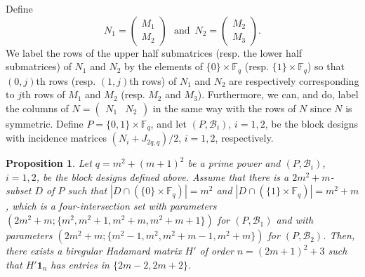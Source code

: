 \documentclass[10pt]{amsart}
\newtheorem{prop}[theo]{Proposition}
\theoremstyle{definition}
\newcommand*\F{{\mathbb F}}
\newcommand*{\un}{\mathbf{1}}
\begin{document}
Define
\[
N_1=
\begin{pmatrix} M_1 \\ M_2
\end{pmatrix} \, \, \mbox{ and }\, N_2=
\begin{pmatrix} M_2 \\ M_3
\end{pmatrix}.
\]
We label the rows of the upper half submatrices (resp. the lower half submatrices) of $N_1$ and $N_2$ by the elements of $\{0\}\times \F_q$ (resp. $\{1\}\times \F_q$) so that $(0,j)$th rows (resp. $(1,j)$th rows) of $N_1$ and $N_2$ are respectively corresponding to $j$th rows of $M_1$ and $M_2$ (resp. $M_2$ and $M_3$). Furthermore, we can, and do, label the columns of $N=\begin{pmatrix} N_1& N_2 \end{pmatrix} $ in the same way with the rows of $N$ since $N$ is symmetric. Define $P=\{0,1\}\times \F_q$, and let $(P,{\mathcal B}_i)$, $i=1,2$, be the block designs with incidence matrices $(N_i+J_{2q,q})/2$, $i=1,2$, respectively.

\begin{prop}\label{prop:const2}
Let $q=m^2+(m+1)^2$ be a prime power and $(P,{\mathcal B}_i)$, $i=1,2$, be the block designs defined above. Assume that there is a $2m^2+m$-subset $D$ of $P$ such that $|D\cap (\{0\}\times \F_q)|=m^2$ and $|D\cap (\{1\}\times \F_q)|=m^2+m$, which is a four-intersection set with parameters $(2m^2+m;\{m^2,m^2+1,m^2+m,m^2+m+1\})$ for $(P,{\mathcal B}_1)$ and with parameters $(2m^2+m;\{m^2-1,m^2,m^2+m-1,m^2+m\})$ for $(P,{\mathcal B}_2)$. Then, there exists a biregular Hadamard matrix $H'$ of order $n=(2m+1)^2+3$ such that $H'\un_{n}$ has entries in $\{2m-2,2m+2\}$.
\end{prop}
\end{document}
